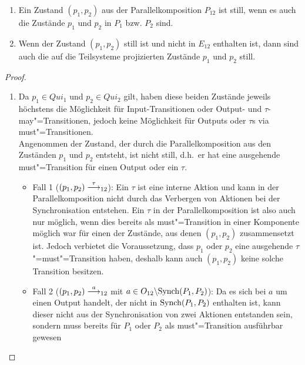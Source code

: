 \begin{Lem}\mbox{}
  \label{StilleZustLem}
  \begin{enumerate}
    \item Ein Zustand $(p_1,p_2)$ aus der Parallelkomposition $P_{12}$ ist
      still, wenn es auch die Zustände $p_1$ und $p_2$ in $P_1$ bzw. $P_2$
      sind.
    \item Wenn der Zustand $(p_1,p_2)$ still ist und nicht in $E_{12}$
      enthalten ist, dann sind auch die auf die Teilsysteme projizierten
      Zustände $p_1$ und $p_2$ still.
  \end{enumerate}
\end{Lem}
\begin{proof}\mbox{}
  \begin{enumerate}
    \item Da $p_1\in Qui_1$ und $p_2\in Qui_2$ gilt, haben diese beiden
      Zustände jeweils höchstens die Möglichkeit für Input-Transitionen oder
      Output- und $\tau$-may"=Transitionen, jedoch keine Möglichkeit für Outputs
      oder $\tau$s via must"=Transitionen.\\
      Angenommen der Zustand, der durch die Parallelkomposition aus den
      Zuständen $p_1$ und $p_2$ entsteht, ist nicht still, d.h.\ er hat eine
      ausgehende must"=Transition für einen Output oder ein $\tau$.
      \begin{itemize}
        \item Fall 1 \big($(p_1,p_2)\must[\tau]_{12}$\big): Ein $\tau$ ist eine
          interne Aktion und kann in der Parallelkomposition nicht durch das
          Verbergen von Aktionen bei der Synchronisation entstehen. Ein $\tau$
          in der Parallelkomposition ist also auch nur möglich, wenn dies
          bereits als must"=Transition in einer Komponente möglich war für
          einen der Zustände, aus denen $(p_1,p_2)$ zusammensetzt ist. Jedoch
          verbietet die Voraussetzung, dass $p_1$ oder $p_2$ eine ausgehende
          $\tau$"=must"=Transition haben, deshalb kann auch $(p_1,p_2)$ keine
          solche Transition besitzen.
        \item Fall 2 \big($(p_1,p_2)\must[a]_{12}$ mit $a\in O_{12}\backslash
          \mathrm{Synch}(P_1,P_2)$\big): Da es sich bei $a$ um einen Output handelt, der
          nicht in $\mathrm{Synch} (P_1,P_2)$ enthalten ist, kann dieser nicht aus der
          Synchronisation von zwei Aktionen entstanden sein, sondern muss
          bereits für $P_1$ oder $P_2$ als must"=Transition ausführbar gewesen

\end{itemize}
\end{enumerate}
\end{proof}
